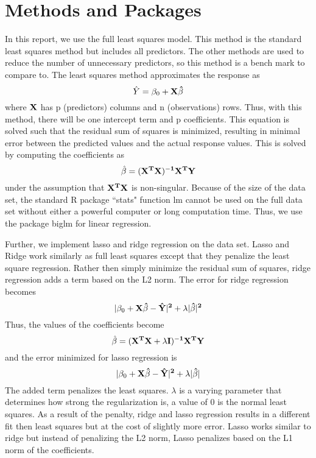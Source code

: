 \documentclass[aps, reprint, groupedaddress, superscriptaddress, amsmath, 10pt]{revtex4-1}
\begin{document}
	\section{Methods and Packages}
	In this report, we use the full least squares model.  This method is the standard least squares method but includes all predictors.  The other methods are used to reduce the number of unnecessary predictors, so this method is a bench mark to compare to.  The least squares method approximates the response as
	\begin{equation}
		\hat{Y} = \beta_0 + \bf{X}\hat{\bf\beta}
	\end{equation}
	where $\bf{X}$ has p (predictors) columns and n (observations) rows.  Thus, with this method, there will be one intercept term and p coefficients.  This equation is solved such that the residual sum of squares is minimized, resulting in minimal error between the predicted values and the actual response values.  This is solved by computing the coefficients as
	\begin{equation}
		\hat{\beta} = (\bf{X}^T\bf{X})^{-1}\bf{X}^T\bf{Y}
	\end{equation}
	under the assumption that $\bf{X}^T\bf{X}$ is non-singular.  Because of the size of the data set, the standard R package ``stats" function lm cannot be used on the full data set without either a powerful computer or long computation time.  Thus, we use the package biglm for linear regression.
	
	Further, we implement lasso and ridge regression on the data set.  Lasso and Ridge work similarly as full least squares except that they penalize the least square regression.  Rather then simply minimize the residual sum of squares, ridge regression adds a term based on the L2 norm.  The error for ridge regression becomes
	\begin{equation}
		|\beta_0 + \bf{X}\hat{\bf\beta} - \hat Y|^2 + \lambda|\hat\beta|^2
	\end{equation}
	Thus, the values of the coefficients become
	\begin{equation} 
		\hat{\beta} = (\bf{X}^T\bf{X} + \lambda\bf{I})^{-1}\bf{X}^T\bf{Y}
	\end{equation}
	and the error minimized for lasso regression is
	\begin{equation}
		|\beta_0 + \bf{X}\hat{\bf\beta} - \hat Y|^2 + \lambda|\hat\beta|
	\end{equation}
	The added term penalizes the least squares.  $\lambda$ is a varying parameter that determines how strong the regularization is, a value of 0 is the normal least squares.  As a result of the penalty, ridge and lasso regression results in a different fit then least squares but at the cost of slightly more error.  Lasso works similar to ridge but instead of penalizing the L2 norm, Lasso penalizes based on the L1 norm of the coefficients.  
	
\end{document}
